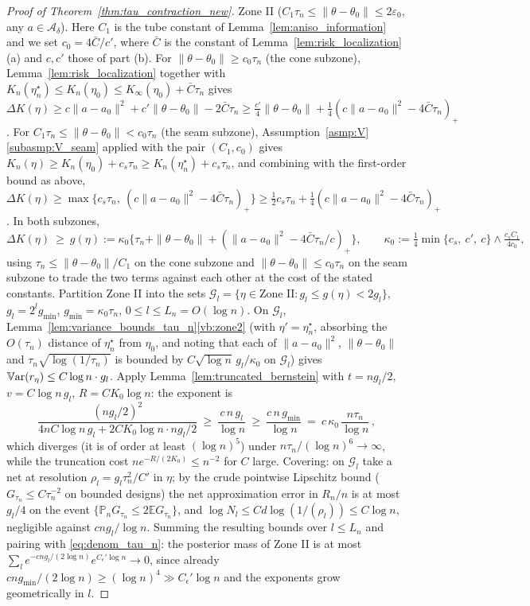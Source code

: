 \documentclass[11pt]{article}
\theoremstyle{definition}
\theoremstyle{plain}
\newcommand{\E}{\mathbb{E}}
\newcommand{\Var}{\mathbb{V}{\rm ar}}
\begin{document}
\begin{proof}[Proof of Theorem~\ref{thm:tau_contraction_new}]
Zone II ($C_1\tau_n\le\|\theta-\theta_0\|\le2\varepsilon_0$, any $a\in\mathcal A_\delta$). Here $C_1$ is the tube constant of Lemma~\ref{lem:aniso_information} and we set $c_0=4\bar C/c'$, where $\bar C$ is the constant of Lemma~\ref{lem:risk_localization}(a) and $c,c'$ those of part (b). For $\|\theta-\theta_0\|\ge c_0\tau_n$ (the cone subzone), Lemma~\ref{lem:risk_localization} together with $K_n(\eta_n^\star)\le K_n(\eta_0)\le K_\infty(\eta_0)+\bar C\tau_n$ gives
$\Delta K(\eta)\ge c\|a-a_0\|^2+c'\|\theta-\theta_0\|-2\bar C\tau_n\ge\tfrac{c'}{4}\|\theta-\theta_0\|+\tfrac14(c\|a-a_0\|^2-4\bar C\tau_n)_+$. For $C_1\tau_n\le\|\theta-\theta_0\|<c_0\tau_n$ (the seam subzone), Assumption~\ref{asmp:V}\ref{subasmp:V_seam} applied with the pair $(C_1,c_0)$ gives $K_n(\eta)\ge K_n(\eta_0)+c_s\tau_n\ge K_n(\eta_n^\star)+c_s\tau_n$, and combining with the first-order bound as above, $\Delta K(\eta)\ge\max\{c_s\tau_n,\ (c\|a-a_0\|^2-4\bar C\tau_n)_+\}\ge\tfrac12c_s\tau_n+\tfrac14(c\|a-a_0\|^2-4\bar C\tau_n)_+$. In both subzones,
\[
\Delta K(\eta)\ \ge\ g(\eta):=\kappa_0\big\{\tau_n+\|\theta-\theta_0\|+(\|a-a_0\|^2-4\bar C\tau_n/c)_+\big\},
\qquad\kappa_0:=\tfrac14\min\{c_s,\ c'\!,\ c\}\wedge\tfrac{c_sC_1}{4c_0},
\]
using $\tau_n\le\|\theta-\theta_0\|/C_1$ on the cone subzone and $\|\theta-\theta_0\|\le c_0\tau_n$ on the seam subzone to trade the two terms against each other at the cost of the stated constants.
Partition Zone II into the sets $\mathcal G_l=\{\eta\in\text{Zone II}:g_l\le g(\eta)<2g_l\}$, $g_l=2^lg_{\min}$, $g_{\min}=\kappa_0\tau_n$, $0\le l\le L_n=O(\log n)$. On $\mathcal G_l$, Lemma~\ref{lem:variance_bounds_tau_n}\ref{vb:zone2} (with $\eta'=\eta_n^\star$, absorbing the $O(\tau_n)$ distance of $\eta_n^\star$ from $\eta_0$, and noting that each of $\|a-a_0\|^2$, $\|\theta-\theta_0\|$ and $\tau_n\sqrt{\log(1/\tau_n)}$ is bounded by $C\sqrt{\log n}\,g_l/\kappa_0$ on $\mathcal G_l$) gives
$\Var(r_\eta)\le C\log n\cdot g_l$.
Apply Lemma~\ref{lem:truncated_bernstein} with $t=ng_l/2$, $v=C\log n\,g_l$, $R=CK_0\log n$: the exponent is
\[
\frac{(ng_l/2)^2}{4nC\log n\,g_l+2CK_0\log n\cdot ng_l/2}\ \ge\ \frac{c\,n\,g_l}{\log n}
\ \ge\ \frac{c\,n\,g_{\min}}{\log n}\ =\ c\,\kappa_0\,\frac{n\tau_n}{\log n}\,,
\]
which diverges (it is of order at least $(\log n)^5$) under $n\tau_n/(\log n)^6\to\infty$, while the truncation cost $ne^{-R/(2K_0)}\le n^{-2}$ for $C$ large. Covering: on $\mathcal G_l$ take a net at resolution $\rho_l=g_l\tau_n^{2}/C'$ in $\eta$; by the crude pointwise Lipschitz bound ($G_{\tau_n}\le C\tau_n^{-2}$ on bounded designs) the net approximation error in $R_n/n$ is at most $g_l/4$ on the event $\{\mathbb P_nG_{\tau_n}\le2\E G_{\tau_n}\}$, and $\log N_l\le Cd\log(1/(\rho_l))\le C\log n$, negligible against $cng_l/\log n$. Summing the resulting bounds over $l\le L_n$ and pairing with \eqref{eq:denom_tau_n}: the posterior mass of Zone II is at most
$\sum_le^{-cng_l/(2\log n)}e^{C_\epsilon'\log n}\to0$,
since already $cng_{\min}/(2\log n)\ge(\log n)^4\gg C_\epsilon'\log n$ and the exponents grow geometrically in $l$.


\end{proof}
\end{document}
